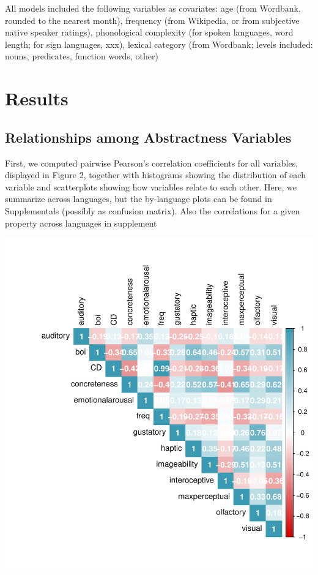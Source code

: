 \documentclass[
  man,floatsintext]{apa6}
\begin{document}
All models included the following variables as covariates: age (from Wordbank, rounded to the nearest month), frequency (from Wikipedia, or from subjective native speaker ratings), phonological complexity (for spoken languages, word length; for sign languages, xxx), lexical category (from Wordbank; levels included: nouns, predicates, function words, other)

\hypertarget{results}{%
\section{Results}\label{results}}

\hypertarget{relationships-among-abstractness-variables}{%
\subsection{Relationships among Abstractness Variables}\label{relationships-among-abstractness-variables}}

First, we computed pairwise Pearson's correlation coefficients for all variables, displayed in Figure 2, together with histograms showing the distribution of each variable and scatterplots showing how variables relate to each other. Here, we summarize across languages, but the by-language plots can be found in Supplementals (possibly as confusion matrix). Also the correlations for a given property across languages in supplement

\includegraphics{crossling_abstractness_manuscript_files/figure-latex/variable-relationships-1.pdf}
\end{document}

